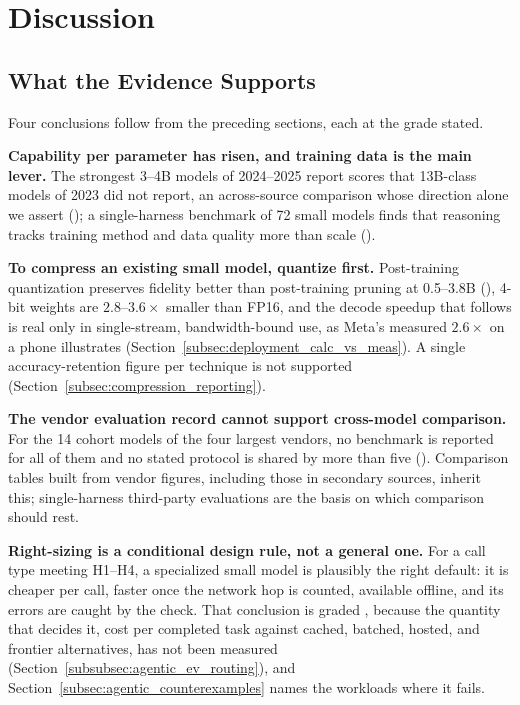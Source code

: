 \section{Discussion}
\label{section:discussion}

\subsection{What the Evidence Supports}
\label{subsec:discussion_key_findings}

Four conclusions follow from the preceding sections, each at the grade stated.

\textbf{Capability per parameter has risen, and training data is the main lever.} The strongest 3--4B models of 2024--2025 report scores that 13B-class models of 2023 did not report, an across-source comparison whose direction alone we assert (\evD); a single-harness benchmark of 72 small models finds that reasoning tracks training method and data quality more than scale \citep{srivastava2025thinkslm} (\evB).

\textbf{To compress an existing small model, quantize first.} Post-training quantization preserves fidelity better than post-training pruning at 0.5--3.8B (\evA), 4-bit weights are $2.8$--$3.6\times$ smaller than FP16, and the decode speedup that follows is real only in single-stream, bandwidth-bound use, as Meta's measured $2.6\times$ on a phone illustrates (Section~\ref{subsec:deployment_calc_vs_meas}). A single accuracy-retention figure per technique is not supported (Section~\ref{subsec:compression_reporting}).

\textbf{The vendor evaluation record cannot support cross-model comparison.} For the 14 cohort models of the four largest vendors, no benchmark is reported for all of them and no stated protocol is shared by more than five (\evB). Comparison tables built from vendor figures, including those in secondary sources, inherit this; single-harness third-party evaluations are the basis on which comparison should rest.

\textbf{Right-sizing is a conditional design rule, not a general one.} For a call type meeting H1--H4, a specialized small model is plausibly the right default: it is cheaper per call, faster once the network hop is counted, available offline, and its errors are caught by the check. That conclusion is graded \evD{}, because the quantity that decides it, cost per completed task against cached, batched, hosted, and frontier alternatives, has not been measured (Section~\ref{subsubsec:agentic_ev_routing}), and Section~\ref{subsec:agentic_counterexamples} names the workloads where it fails.

